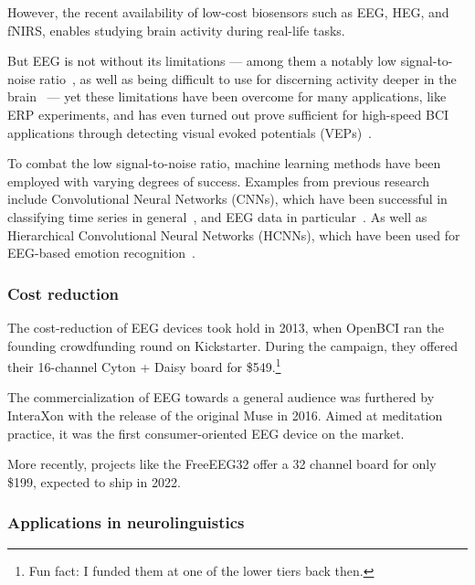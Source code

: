     However, the recent availability of low-cost biosensors such as EEG, HEG, and fNIRS, enables studying brain activity during real-life tasks.

    But EEG is not without its limitations --- among them a notably low signal-to-noise ratio~\cite{mcfarland_eeg-based_2017}, as well as being difficult to use for discerning activity deeper in the brain~\cite{fahimi_hnazaee_localization_2020} --- yet these limitations have been overcome for many applications, like ERP experiments, and has even turned out prove sufficient for high-speed BCI applications through detecting visual evoked potentials (VEPs)~\cite{spuler_high-speed_2017}.

    To combat the low signal-to-noise ratio, machine learning methods have been employed with varying degrees of success. Examples from previous research include Convolutional Neural Networks (CNNs), which have been successful in classifying time series in general~\cite{zhao_convolutional_2017}, and EEG data in particular~\cite{schirrmeister_deep_2017}. As well as Hierarchical Convolutional Neural Networks (HCNNs), which have been used for EEG-based emotion recognition~\cite{li_hierarchical_2018}.


    \subsubsection{Cost reduction}

    The cost-reduction of EEG devices took hold in 2013, when OpenBCI ran the founding crowdfunding round on Kickstarter. During the campaign, they offered their 16-channel Cyton + Daisy board for \$549.\footnote{Fun fact: I funded them at one of the lower tiers back then.}\cite{noauthor_openbci_nodate}

    The commercialization of EEG towards a general audience was furthered by InteraXon with the release of the original Muse in 2016. Aimed at meditation practice, it was the first consumer-oriented EEG device on the market.

    More recently, projects like the FreeEEG32 offer a 32 channel board for only \$199, expected to ship in 2022.\cite{noauthor_freeeeg32_nodate}

    \subsubsection{Applications in neurolinguistics}

